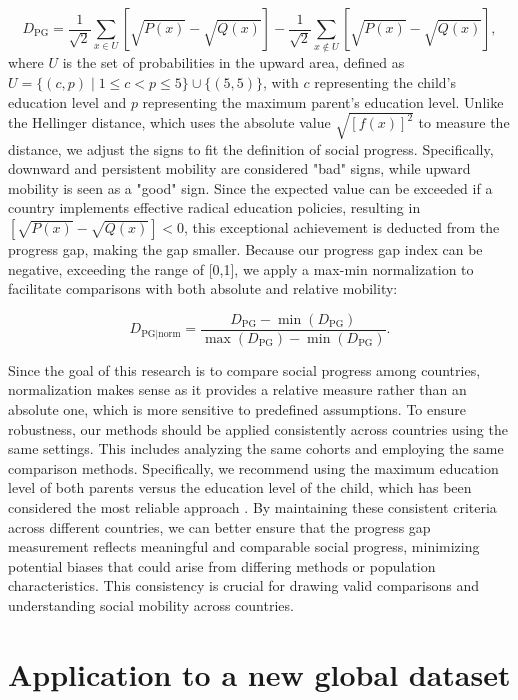 \[
D_{\text{PG}} = \frac{1}{\sqrt{2}} \sum_{x \in U} \left[ \sqrt{P(x)} - \sqrt{Q(x)} \right] - \frac{1}{\sqrt{2}} \sum_{x \notin U} \left[ \sqrt{P(x)} - \sqrt{Q(x)} \right],
\]
where \( U \) is the set of probabilities in the upward area, defined as \( U = \{ (c,p) \mid 1 \leq c < p \leq 5 \} \cup \{ (5,5) \} \), with \( c \) representing the child’s education level and \( p \) representing the maximum parent’s education level. Unlike the Hellinger distance, which uses the absolute value \( \sqrt{[f(x)]^2} \) to measure the distance, we adjust the signs to fit the definition of social progress. Specifically, downward and persistent mobility are considered "bad" signs, while upward mobility is seen as a "good" sign. Since the expected value can be exceeded if a country implements effective radical education policies, resulting in \( \left[\sqrt{P(x)} - \sqrt{Q(x)}\right] < 0 \), this exceptional achievement is deducted from the progress gap, making the gap smaller. Because our progress gap index can be negative, exceeding the range of [0,1], we apply a max-min normalization to facilitate comparisons with both absolute and relative mobility:

\[
D_{\text{PG}|\text{norm}} = \frac{D_{\text{PG}} - \min(D_{\text{PG}})}{\max(D_{\text{PG}}) - \min(D_{\text{PG}})}.
\]

Since the goal of this research is to compare social progress among countries, normalization makes sense as it provides a relative measure rather than an absolute one, which is more sensitive to predefined assumptions. To ensure robustness, our methods should be applied consistently across countries using the same settings. This includes analyzing the same cohorts and employing the same comparison methods. Specifically, we recommend using the maximum education level of both parents versus the education level of the child, which has been considered the most reliable approach \citep{van2024intergenerational}. By maintaining these consistent criteria across different countries, we can better ensure that the progress gap measurement reflects meaningful and comparable social progress, minimizing potential biases that could arise from differing methods or population characteristics. This consistency is crucial for drawing valid comparisons and understanding social mobility across countries.

\section{Application to a new global dataset} \label{sec:application}


